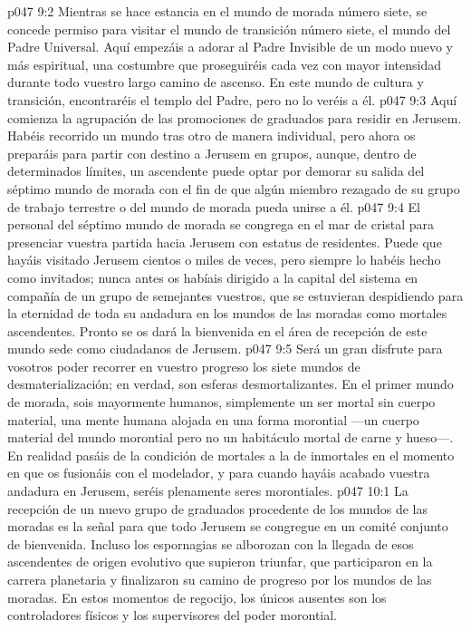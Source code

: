 \vs p047 9:2 Mientras se hace estancia en el mundo de morada número siete, se concede permiso para visitar el mundo de transición número siete, el mundo del Padre Universal. Aquí empezáis a adorar al Padre Invisible de un modo nuevo y más espiritual, una costumbre que proseguiréis cada vez con mayor intensidad durante todo vuestro largo camino de ascenso. En este mundo de cultura y transición, encontraréis el templo del Padre, pero no lo veréis a él.
\vs p047 9:3 \pc Aquí comienza la agrupación de las promociones de graduados para residir en Jerusem. Habéis recorrido un mundo tras otro de manera individual, pero ahora os preparáis para partir con destino a Jerusem en grupos, aunque, dentro de determinados límites, un ascendente puede optar por demorar su salida del séptimo mundo de morada con el fin de que algún miembro rezagado de su grupo de trabajo terrestre o del mundo de morada pueda unirse a él.
\vs p047 9:4 El personal del séptimo mundo de morada se congrega en el mar de cristal para presenciar vuestra partida hacia Jerusem con estatus de residentes. Puede que hayáis visitado Jerusem cientos o miles de veces, pero siempre lo habéis hecho como invitados; nunca antes os habíais dirigido a la capital del sistema en compañía de un grupo de semejantes vuestros, que se estuvieran despidiendo para la eternidad de toda su andadura en los mundos de las moradas como mortales ascendentes. Pronto se os dará la bienvenida en el área de recepción de este mundo sede como ciudadanos de Jerusem.
\vs p047 9:5 \pc Será un gran disfrute para vosotros poder recorrer en vuestro progreso los siete mundos de desmaterialización; en verdad, son esferas desmortalizantes. En el primer mundo de morada, sois mayormente humanos, simplemente un ser mortal sin cuerpo material, una mente humana alojada en una forma morontial ---un cuerpo material del mundo morontial pero no un habitáculo mortal de carne y hueso---. En realidad pasáis de la condición de mortales a la de inmortales en el momento en que os fusionáis con el modelador, y para cuando hayáis acabado vuestra andadura en Jerusem, seréis plenamente seres morontiales.
\vs p047 10:1 La recepción de un nuevo grupo de graduados procedente de los mundos de las moradas es la señal para que todo Jerusem se congregue en un comité conjunto de bienvenida. Incluso los espornagias se alborozan con la llegada de esos ascendentes de origen evolutivo que supieron triunfar, que participaron en la carrera planetaria y finalizaron su camino de progreso por los mundos de las moradas. En estos momentos de regocijo, los únicos ausentes son los controladores físicos y los supervisores del poder morontial.
